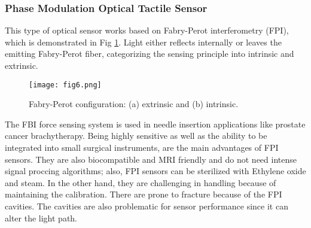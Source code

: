 \documentclass[conference]{IEEEtran}
\begin{document}
\subsubsection{Phase Modulation Optical Tactile Sensor }
This type of optical sensor works based on Fabry-Perot interferometry (FPI), which is demonstrated in Fig \ref{fig3}. Light either reflects internally or leaves the emitting Fabry-Perot fiber, categorizing the sensing principle into intrinsic and extrinsic.\\
\begin{figure}[h]
	\centerline{\texttt{[image: fig6.png]}}
	\caption{Fabry-Perot configuration: (a) extrinsic and (b) intrinsic.}
	\label{fig3}
\end{figure}
The FBI force sensing system is used in needle insertion applications like prostate cancer brachytherapy. Being highly sensitive as well as the ability to be integrated into small surgical instruments, are the main advantages of FPI sensors. They are also biocompatible and MRI friendly and do not need intense signal proccing algorithms; also, FPI sensors can be sterilized with Ethylene oxide and steam. In the other hand, they are challenging in handling because of maintaining the calibration. There are prone to fracture because of the FPI cavities. The cavities are also problematic for sensor performance since it can alter the light path. 
\end{document}
